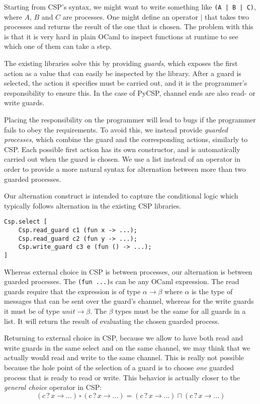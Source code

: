 \documentclass[a4paper,12pt]{article}
\begin{document}
Starting from CSP's syntax, we might want to write something like \texttt{(A | B | C)}, where $A$, $B$
and $C$ are processes. One might define an operator $|$ that takes two processes and returns the result 
of the one that is chosen. The problem with this is that it is very hard in plain OCaml to inspect 
functions at runtime to see which one of them can take a step.

The existing libraries solve this by providing \emph{guards}, which exposes the first action as a value 
that can easily be inspected by the library. After a guard is selected, the action it specifies must be 
carried out, and it is the programmer's responsibility to ensure this. In the case of PyCSP, channel
ends are also read- or write guards. 

Placing the responsibility on the programmer will lead to bugs if the programmer
fails to obey the requirements. To avoid this, we instead provide \emph{guarded
processes}, which combine the guard and the corresponding actions, similarly to
CSP. Each possible first action has its own constructor, and is automatically
carried out when the guard is chosen. We use a list instead of an operator in
order to provide a more natural syntax for alternation between more than two
guarded processes.

Our alternation construct is intended to capture the conditional logic which typically follows 
alternation in the existing CSP libraries.

\begin{verbatim}
Csp.select [
    Csp.read_guard c1 (fun x -> ...);
    Csp.read_guard c2 (fun y -> ...);
    Csp.write_guard c3 e (fun () -> ...);
]
\end{verbatim}

Whereas external choice in CSP is between processes, our alternation is between guarded processes.
The \verb|(fun ...)|s can be any OCaml expression. The read guards require that the expression is of type
$\alpha \to \beta$ where $\alpha$ is the type of messages that can be sent over the guard's channel, whereas
for the write guards it must be of type $unit \to \beta$. The $\beta$ types must be the same for all guards in 
a list. It will return the result of evaluating the chosen guarded process.

Returning to external choice in CSP, because we allow to have both read and
write guards in the same select and on the same channel, we may think that we
actually would read and write to the same channel. This is really not possible
because the hole point of the selection of a guard is to choose {\it one}
guarded process that is ready to read or write. This behavior is actually closer
to the {\it general choice} operator in CSP:
\[
(c\,?\,x \to ...)\, \square \, (c\,?\,x \to ...) =
(c\,?\,x \to ...) \sqcap (c\,?\,x \to ...)
\]
\end{document}
